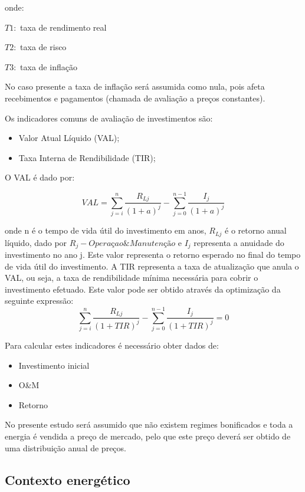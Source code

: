 \documentclass[
  letterpaper,
  DIV=11,
  numbers=noendperiod]{scrartcl}
\providecommand{\tightlist}{%
  \setlength{\itemsep}{0pt}\setlength{\parskip}{0pt}}\usepackage{longtable,booktabs,array}
\begin{document}
onde:

\(T1:\) taxa de rendimento real

\(T2:\) taxa de risco

\(T3:\) taxa de inflação

No caso presente a taxa de inflação será assumida como nula, pois afeta
recebimentos e pagamentos (chamada de avaliação a preços constantes).

Os indicadores comuns de avaliação de investimentos são:

\begin{itemize}
\tightlist
\item
  Valor Atual Líquido (VAL);
\item
  Taxa Interna de Rendibilidade (TIR);
\end{itemize}

O VAL é dado por:

\[
VAL = \sum_{j=i}^n\frac{R_{Lj}}{(1+a)^j} - \sum_{j=0}^{n-1} \frac{I_j}{(1+a)^j}
\]

onde n é o tempo de vida útil do investimento em anos, \(R_{Lj}\) é o
retorno anual líquido, dado por \(R_j-Operaçao\&Manutenção\) e \(I_j\)
representa a anuidade do investimento no ano j. Este valor representa o
retorno esperado no final do tempo de vida útil do investimento. A TIR
representa a taxa de atualização que anula o VAL, ou seja, a taxa de
rendibilidade mínima necessária para cobrir o investimento efetuado.
Este valor pode ser obtido através da optimização da seguinte expressão:
\[
\sum_{j=i}^n\frac{R_{Lj}}{(1+TIR)^j} - \sum_{j=0}^{n-1} \frac{I_j}{(1+TIR)^j} = 0
\]

Para calcular estes indicadores é necessário obter dados de:

\begin{itemize}
\tightlist
\item
  Investimento inicial
\item
  O\&M
\item
  Retorno
\end{itemize}

No presente estudo será assumido que não existem regimes bonificados e
toda a energia é vendida a preço de mercado, pelo que este preço deverá
ser obtido de uma distribuição anual de preços.

\hypertarget{contexto-energuxe9tico}{%
\subsection{Contexto energético}\label{contexto-energuxe9tico}}
\end{document}
